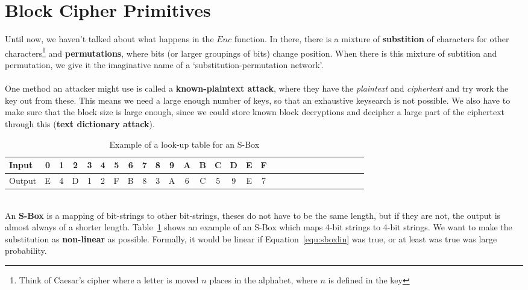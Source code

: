 \section{Block Cipher Primitives}
    Until now, we haven't talked about what happens in the $Enc$ function. In there, there is a mixture of \textbf{substition} of characters for other characters\footnote{Think of Caesar's cipher where a letter is moved $n$ places in the alphabet, where $n$ is defined in the key} and \textbf{permutations}, where bits (or larger groupings of bits) change position. When there is this mixture of subtition and permutation, we give it the imaginative name of a `substitution-permutation network'.\\
    \\
    One method an attacker might use is called a \textbf{known-plaintext attack}, where they have the \textit{plaintext} and \textit{ciphertext} and try work the key out from these. This means we need a large enough number of keys, so that an exhaustive keysearch is not possible. We also have to make sure that the block size is large enough, since we could store known block decryptions and decipher a large part of the ciphertext through this (\textbf{text dictionary attack}).\\
    \begin{table}[htp!]
        \centering
        \begin{tabular}{lccccccccccccccccccccccccccc}
            \toprule
            Input & 0 & 1 & 2 & 3 & 4 & 5 & 6 & 7 & 8 & 9 & A & B & C & D  & E & F\\
            \midrule
            Output & E & 4 & D & 1 & 2 & F & B & 8 & 3 & A & 6 & C & 5 & 9 & E & 7\\
            \bottomrule
        \end{tabular}
        \caption{Example of a look-up table for an S-Box}
        \label{fig:lookupsbox}
    \end{table}
    \\
    An \textbf{S-Box} is a mapping of bit-strings to other bit-strings, theses do not have to be the same length, but if they are not, the output is almost always of a shorter length. Table~\ref{fig:lookupsbox} shows an example of an S-Box which maps 4-bit strings to 4-bit strings. We want to make the substitution as \textbf{non-linear} as possible. Formally, it would be linear if Equation~\ref{equ:sboxlin} was true, or at least was true was large probability.
    
